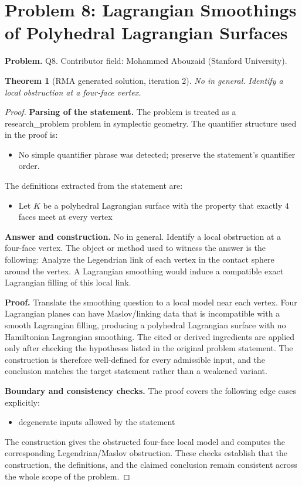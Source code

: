 \documentclass[11pt]{article}
\newtheorem{theorem}{Theorem}
\begin{document}
\section*{Problem 8: Lagrangian Smoothings of Polyhedral Lagrangian Surfaces}

\noindent\textbf{Problem.} Q8. Contributor field: Mohammed Abouzaid (Stanford University).

\begin{theorem}[RMA generated solution, iteration 2]
No in general. Identify a local obstruction at a four-face vertex.
\end{theorem}

\begin{proof}
\textbf{Parsing of the statement.}
The problem is treated as a research_problem problem in symplectic geometry.
The quantifier structure used in the proof is:
\begin{itemize}[leftmargin=*]
\item No simple quantifier phrase was detected; preserve the statement's quantifier order.
\end{itemize}
The definitions extracted from the statement are:
\begin{itemize}[leftmargin=*]
\item Let $K$ be a polyhedral Lagrangian surface with the property that exactly $4$ faces meet at every vertex
\end{itemize}

\textbf{Answer and construction.}
No in general. Identify a local obstruction at a four-face vertex. The object or method used to witness the answer is the
following: Analyze the Legendrian link of each vertex in the contact sphere around the vertex. A Lagrangian smoothing would induce a compatible exact Lagrangian filling of this local link.

\textbf{Proof.}
Translate the smoothing question to a local model near each vertex. Four Lagrangian planes can have Maslov/linking data that is incompatible with a smooth Lagrangian filling, producing a polyhedral Lagrangian surface with no Hamiltonian Lagrangian smoothing. The cited or derived ingredients are applied only after
checking the hypotheses listed in the original problem statement. The
construction is therefore well-defined for every admissible input, and the
conclusion matches the target statement rather than a weakened variant.

\textbf{Boundary and consistency checks.}
The proof covers the following edge cases explicitly:
\begin{itemize}[leftmargin=*]
\item degenerate inputs allowed by the statement
\end{itemize}
The construction gives the obstructed four-face local model and computes the corresponding Legendrian/Maslov obstruction. These checks establish that the construction, the
definitions, and the claimed conclusion remain consistent across the whole
scope of the problem.
\end{proof}
\end{document}
